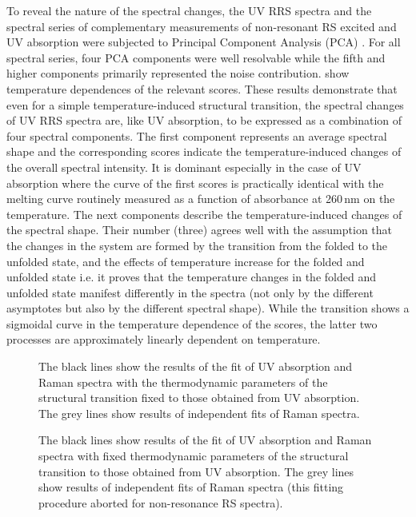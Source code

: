 To reveal the nature of the spectral changes, the UV RRS spectra and the
spectral series of complementary measurements of non-resonant RS excited and UV
absorption were subjected to Principal Component Analysis (PCA)
\parencite{Malinowski2002}.
For all spectral series, four PCA components were well resolvable while the
fifth and higher components primarily represented the noise contribution.
show temperature dependences of the relevant scores.
These results demonstrate that even for a simple temperature-induced structural
transition, the spectral changes of UV RRS spectra are, like UV absorption,
to be expressed as a combination of four spectral components.
The first component represents an average spectral shape and the corresponding
scores indicate the temperature-induced changes of the overall spectral
intensity.
It is dominant especially in the case of UV absorption where the curve of the
first scores is practically identical with the melting curve routinely measured
as a function of absorbance at 260\,nm on the temperature.
The next components describe the temperature-induced changes of the spectral
shape.
Their number (three) agrees well with the assumption that the changes in the
system are formed by the transition from the folded to the unfolded state, and
the effects of temperature increase for the folded and unfolded state i.e. it
proves that the temperature changes in the folded and unfolded state manifest
differently in the spectra (not only by the different asymptotes but also by
the different spectral shape).
While the transition shows a sigmoidal curve in the temperature dependence of
the scores, the latter two processes are approximately linearly dependent on
temperature.

\begin{figure}
	\centering
	\caption[%
		PCA scores obtained for the duplex spectra.
	]{%
		The black lines show the results of the fit of UV absorption and Raman
		spectra with the thermodynamic parameters of the structural transition
		fixed to those obtained from UV absorption.
		The grey lines show results of independent fits of Raman spectra.
	}
	\label{\figlabel{dna_hairpins:pca_duplex}}
\end{figure}

\begin{figure}
	\centering
	\caption[%
		PCA scores obtained for the hairpin spectra.
	]{%
		The black lines show results of the fit of UV absorption and Raman spectra
		with fixed thermodynamic parameters of the structural transition to those
		obtained from UV absorption.
		The grey lines show results of independent fits of Raman spectra (this
		fitting procedure aborted for non-resonance RS spectra).
	}
	\label{\figlabel{dna_hairpins:pca_hairpin}}
\end{figure}

